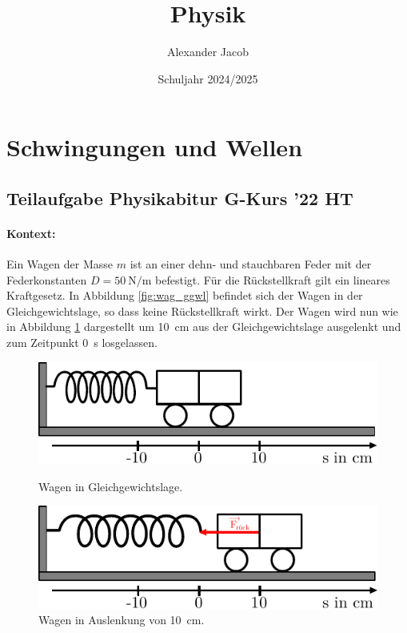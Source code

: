 \documentclass{ajc}
\title{Physik}
\author{Alexander Jacob}
\date{Schuljahr 2024/2025}
\begin{document}
	\section{Schwingungen und Wellen}
	
	\subsection{Teilaufgabe Physikabitur G-Kurs '22 HT}
	\paragraph{Kontext:}Ein Wagen der Masse $m$ ist an einer dehn- und stauchbaren Feder mit der Federkonstanten $D = \SI{50}{\newton\per\meter}$ befestigt. Für die Rückstellkraft gilt ein lineares Kraftgesetz. In Abbildung \ref{fig:wag_ggwl} befindet sich der Wagen in der Gleichgewichtslage, so dass keine Rückstellkraft wirkt. Der Wagen wird nun wie in Abbildung \ref{fig:wag_al} dargestellt um \SI{10}{\cm} aus der Gleichgewichtslage ausgelenkt und zum Zeitpunkt \SI{0}{\s} losgelassen.
	\begin{figure}[ht]
		\centering
		\begin{minipage}[b]{0.4\textwidth}
			\includegraphics[width=\textwidth]{ph_wagen_ggwl.pdf}
			\caption{Wagen in Gleichgewichtslage.}
			\label{fig:wag_ggwl}
		\end{minipage}
		\hfill
		\begin{minipage}[b]{0.4\textwidth}
			\includegraphics[width=\textwidth]{ph_wagen_al.pdf}
			\caption{Wagen in Auslenkung von \SI{10}{\cm}.}
			\label{fig:wag_al}
		\end{minipage}
	\end{figure}
\end{document}

